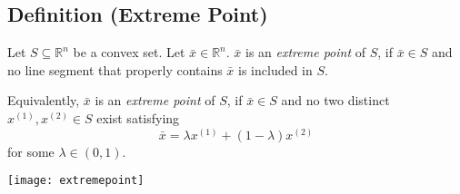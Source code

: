 \begin{defbox}
    \subsection{Definition (Extreme Point)}
    Let $ S\subseteq \mathbb{R}^n $ be a convex set.
    Let $ \bar{x}\in\mathbb{R}^n $.
    $ \bar{x} $ is an \emph{extreme point} of $ S $, if $ \bar{x}\in S $ and
    no line segment that properly contains $ \bar{x} $ is included
    in $ S $.

    Equivalently, $ \bar{x} $ is an \emph{extreme point} of $ S $, if 
    $ \bar{x}\in S $ and no two distinct $ x^{(1)},x^{(2)}\in S $ exist satisfying
    \[ \bar{x}=\lambda x^{(1)} + (1-\lambda)x^{(2)} \]
    for some $ \lambda\in (0,1) $.
\end{defbox}

\begin{center}
    \texttt{[image: extremepoint]}
\end{center}